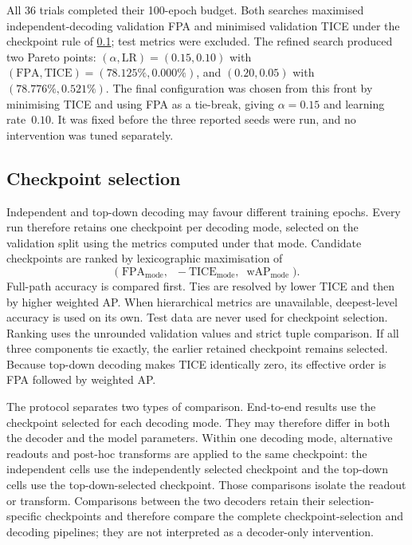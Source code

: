 All 36 trials completed their 100-epoch budget. Both searches maximised
independent-decoding validation FPA and minimised validation TICE under the
checkpoint rule of \cref{ssec:design_checkpoints}; test metrics were excluded.
The refined search produced two Pareto points: $(\alpha,\mathrm{LR})=(0.15,0.10)$
with $(\mathrm{FPA},\mathrm{TICE})=(78.125\%,0.000\%)$, and $(0.20,0.05)$ with
$(78.776\%,0.521\%)$. The final configuration was chosen from this front by
minimising TICE and using FPA as a tie-break, giving $\alpha=0.15$ and learning
rate~$0.10$. It was fixed before the three reported seeds were run, and no
intervention was tuned separately.

\subsection{Checkpoint selection}
\label{ssec:design_checkpoints}

Independent and top-down decoding may favour different training epochs. Every
run therefore retains one checkpoint per decoding mode, selected on the
validation split using the metrics computed under that mode. Candidate
checkpoints are ranked by lexicographic maximisation of
\[
\Big(\;\mathrm{FPA}_{\text{mode}},\;\; -\mathrm{TICE}_{\text{mode}},\;\;
\mathrm{wAP}_{\text{mode}}\;\Big).
\]
Full-path accuracy is compared first. Ties are resolved by lower TICE
and then by higher weighted AP. When hierarchical metrics are unavailable,
deepest-level accuracy is used on its own. Test data are never used for
checkpoint selection. Ranking uses the unrounded validation values and strict
tuple comparison. If all three components tie exactly, the earlier retained
checkpoint remains selected. Because top-down decoding makes TICE identically
zero, its effective order is FPA followed by weighted AP.

The protocol separates two types of comparison. End-to-end results use the
checkpoint selected for each decoding mode. They may therefore differ in both
the decoder and the model parameters. Within one decoding mode, alternative
readouts and post-hoc transforms are applied to the same checkpoint: the
independent cells use the independently selected checkpoint and the top-down
cells use the top-down-selected checkpoint. Those comparisons isolate the
readout or transform. Comparisons between the two decoders retain their
selection-specific checkpoints and therefore compare the complete
checkpoint-selection and decoding pipelines; they are not interpreted as a
decoder-only intervention.

